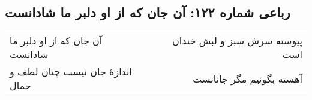 \begin{center}
\section*{رباعی شماره ۱۲۲: آن جان که از او دلبر ما شادانست}
\label{sec:0122}
\begin{longtable}{l p{0.5cm} r}
آن جان که از او دلبر ما شادانست
&&
پیوسته سرش سبز و لبش خندان است
\\
اندازهٔ جان نیست چنان لطف و جمال
&&
آهسته بگوئیم مگر جانانست
\\
\end{longtable}
\end{center}
